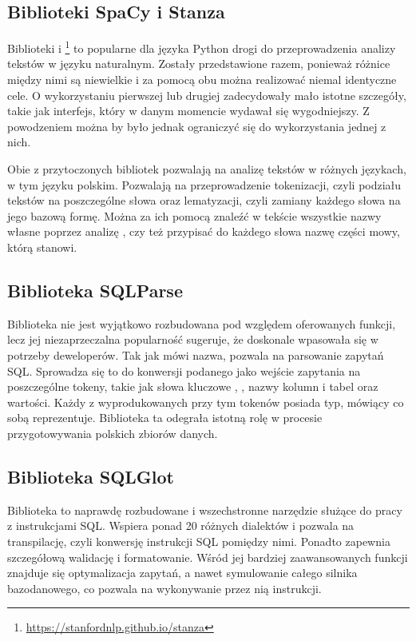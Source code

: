 \subsection{Biblioteki SpaCy i Stanza}
Biblioteki  i \footnote{\url{https://stanfordnlp.github.io/stanza}} to popularne dla języka Python drogi do przeprowadzenia analizy tekstów w języku naturalnym. Zostały przedstawione razem, ponieważ różnice między nimi są niewielkie i za pomocą obu można realizować niemal identyczne cele. O wykorzystaniu pierwszej lub drugiej zadecydowały mało istotne szczegóły, takie jak interfejs, który w danym momencie wydawał się wygodniejszy. Z powodzeniem można by było jednak ograniczyć się do wykorzystania jednej z nich.

Obie z przytoczonych bibliotek pozwalają na analizę tekstów w różnych językach, w tym języku polskim. Pozwalają na przeprowadzenie tokenizacji, czyli podziału tekstów na poszczególne słowa oraz lematyzacji, czyli zamiany każdego słowa na jego bazową formę. Można za ich pomocą znaleźć w tekście wszystkie nazwy własne poprzez analizę  , czy też przypisać do każdego słowa nazwę części mowy, którą stanowi. 

\subsection{Biblioteka SQLParse}
Biblioteka  nie jest wyjątkowo rozbudowana pod względem oferowanych funkcji, lecz jej niezaprzeczalna popularność sugeruje, że doskonale wpasowała się w potrzeby deweloperów. Tak jak mówi nazwa,  pozwala na parsowanie zapytań SQL. Sprowadza się to do konwersji podanego jako wejście zapytania na poszczególne tokeny, takie jak słowa kluczowe , , nazwy kolumn i tabel oraz wartości. Każdy z wyprodukowanych przy tym tokenów posiada typ, mówiący co sobą reprezentuje. Biblioteka ta odegrała istotną rolę w procesie przygotowywania polskich zbiorów danych.

\subsection{Biblioteka SQLGlot}
Biblioteka  to naprawdę rozbudowane i wszechstronne narzędzie służące do pracy z instrukcjami SQL. Wspiera ponad 20 różnych dialektów i pozwala na transpilację, czyli konwersję instrukcji SQL pomiędzy nimi. Ponadto zapewnia szczegółową walidację i formatowanie. Wśród jej bardziej zaawansowanych funkcji znajduje się optymalizacja zapytań, a nawet symulowanie całego silnika bazodanowego, co pozwala na wykonywanie przez nią instrukcji.

